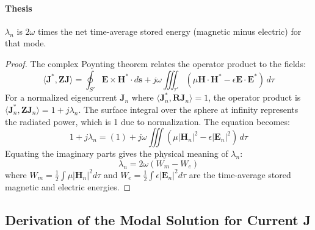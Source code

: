 \documentclass[11pt, a4paper]{report}
\begin{document}
\paragraph{Thesis} $\lambda_n$ is $2\omega$ times the net time-average stored energy (magnetic minus electric) for that mode.
\begin{proof}
The complex Poynting theorem relates the operator product to the fields:
\begin{equation}
\langle \mathbf{J}^*, \mathbf{Z}\mathbf{J} \rangle = \oint_{S'} \mathbf{E} \times \mathbf{H}^* \cdot d\mathbf{s} + j\omega \iiint_{\tau'} (\mu \mathbf{H}\cdot\mathbf{H}^* - \epsilon \mathbf{E}\cdot\mathbf{E}^*) \,d\tau
\end{equation}
For a normalized eigencurrent $\mathbf{J}_n$ where $\langle \mathbf{J}_n^*, \mathbf{R}\mathbf{J}_n \rangle = 1$, the operator product is $\langle \mathbf{J}_n^*, \mathbf{Z}\mathbf{J}_n \rangle = 1+j\lambda_n$. The surface integral over the sphere at infinity represents the radiated power, which is 1 due to normalization. The equation becomes:
\begin{equation}
1 + j\lambda_n = (1) + j\omega \iiint (\mu |\mathbf{H}_n|^2 - \epsilon |\mathbf{E}_n|^2) \,d\tau
\end{equation}
Equating the imaginary parts gives the physical meaning of $\lambda_n$:
\begin{equation}
\lambda_n = 2\omega \left( W_m - W_e \right)
\end{equation}
where $W_m = \frac{1}{2}\int \mu|\mathbf{H}_n|^2 d\tau$ and $W_e = \frac{1}{2}\int \epsilon|\mathbf{E}_n|^2 d\tau$ are the time-average stored magnetic and electric energies.
\end{proof}

\subsection{Derivation of the Modal Solution for Current J} \label{ssec:proof_modal}
\end{document}

